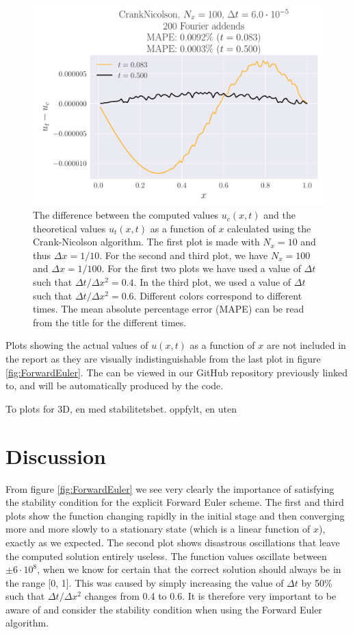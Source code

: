 \documentclass[reprint, english,notitlepage,nofootinbib]{revtex4-1}  %
\begin{document}
\begin{figure}
  \includegraphics[width=\linewidth]{CrankNicolson-Nt8333-dt6_0e-05-Nx100-Error.pdf}
  \caption{The difference between the computed values \(u_c(x, t)\) and the theoretical values \(u_t(x, t)\) as a function of \(x\) calculated using the Crank-Nicolson algorithm. The first plot is made with \(N_x = 10\) and thus \(\Delta x = 1/10\). For the second and third plot, we have \(N_x = 100\) and \(\Delta x = 1/100\). For the first two plots we have used a value of \(\Delta t\) such that \(\Delta t / \Delta x^2 = 0.4\). In the third plot, we used a value of \(\Delta t\) such that \(\Delta t / \Delta x^2 = 0.6\). Different colors correspond to different times. The mean absolute percentage error (MAPE) can be read from the title for the different times.}
  \label{fig:CrankNicolson_error}
\end{figure}

Plots showing the actual values of \(u(x, t)\) as a function of \(x\) are not included in the report as they are visually indistinguishable from the last plot in figure \ref{fig:ForwardEuler}. The can be viewed in our GitHub repository previously linked to, and will be automatically produced by the code.

To plots for 3D, en med stabilitetsbet. oppfylt, en uten



\section{Discussion}

From figure \ref{fig:ForwardEuler} we see very clearly the importance of satisfying the stability condition for the explicit Forward Euler scheme. The first and third plots show the function changing rapidly in the initial stage and then converging more and more slowly to a stationary state (which is a linear function of \(x\)), exactly as we expected. The second plot shows disastrous oscillations that leave the computed solution entirely useless. The function values oscillate between \(\pm 6 \cdot 10^8\), when we know for certain that the correct solution should always be in the range [0, 1]. This was caused by simply increasing the value of \(\Delta t\) by 50\% such that \(\Delta t / \Delta x^2\) changes from 0.4 to 0.6. It is therefore very important to be aware of and consider the stability condition when using the Forward Euler algorithm.
\end{document}
